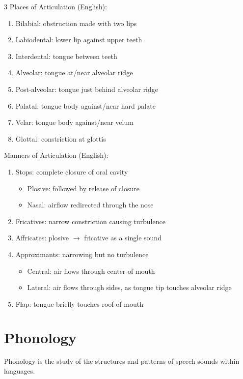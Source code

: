 \documentclass[12pt, a4paper]{article}
\begin{document}
\begin{multicols*}{3}
Places of Articulation (English):
\begin{enumerate}[\roman*.]
  \item Bilabial: obstruction made with two lips
  \item Labiodental: lower lip against upper teeth
  \item Interdental: tongue between teeth
  \item Alveolar: tongue at/near alveolar ridge
  \item Post-alveolar: tongue just behind alveolar ridge
  \item Palatal: tongue body against/near hard palate
  \item Velar: tongue body against/near velum
  \item Glottal: constriction at glottis
\end{enumerate}

Manners of Articulation (English):
\begin{enumerate}[\roman*.]
  \item Stops: complete closure of oral cavity
    \begin{itemize}[leftmargin=*]\vspace{3pt}
      \item Plosive: followed by release of closure
      \item Nasal: airflow redirected through the nose
    \end{itemize}
  \item Fricatives: narrow constriction causing turbulence 
  \item Affricates: plosive $\rightarrow$ fricative as a single sound
  \item Approximants: narrowing but no turbulence 
    \begin{itemize}[leftmargin=*]\vspace{3pt}
      \item Central: air flows through center of mouth
      \item Lateral: air flows through sides, as tongue tip touches alveolar ridge
    \end{itemize}
  \item Flap: tongue briefly touches roof of mouth
\end{enumerate}

\colbreak
\section{Phonology}
Phonology is the study of the structures and patterns of speech sounds within languages.


\end{multicols*}
\end{document}
